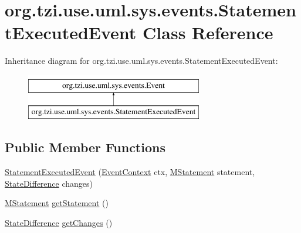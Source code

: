 \hypertarget{classorg_1_1tzi_1_1use_1_1uml_1_1sys_1_1events_1_1_statement_executed_event}{\section{org.\-tzi.\-use.\-uml.\-sys.\-events.\-Statement\-Executed\-Event Class Reference}
\label{classorg_1_1tzi_1_1use_1_1uml_1_1sys_1_1events_1_1_statement_executed_event}
}
Inheritance diagram for org.\-tzi.\-use.\-uml.\-sys.\-events.\-Statement\-Executed\-Event\-:\begin{figure}[H]
\begin{center}
\leavevmode
\includegraphics[height=2.000000cm]{classorg_1_1tzi_1_1use_1_1uml_1_1sys_1_1events_1_1_statement_executed_event}
\end{center}
\end{figure}
\subsection*{Public Member Functions}
\begin{DoxyCompactItemize}
\item 
\hyperlink{classorg_1_1tzi_1_1use_1_1uml_1_1sys_1_1events_1_1_statement_executed_event_a6d275841436f08306156d4e21918896f}{Statement\-Executed\-Event} (\hyperlink{enumorg_1_1tzi_1_1use_1_1uml_1_1sys_1_1events_1_1tags_1_1_event_context}{Event\-Context} ctx, \hyperlink{classorg_1_1tzi_1_1use_1_1uml_1_1sys_1_1soil_1_1_m_statement}{M\-Statement} statement, \hyperlink{classorg_1_1tzi_1_1use_1_1util_1_1soil_1_1_state_difference}{State\-Difference} changes)
\item 
\hyperlink{classorg_1_1tzi_1_1use_1_1uml_1_1sys_1_1soil_1_1_m_statement}{M\-Statement} \hyperlink{classorg_1_1tzi_1_1use_1_1uml_1_1sys_1_1events_1_1_statement_executed_event_ac902347048b650367e001f1fdfc534ae}{get\-Statement} ()
\item 
\hyperlink{classorg_1_1tzi_1_1use_1_1util_1_1soil_1_1_state_difference}{State\-Difference} \hyperlink{classorg_1_1tzi_1_1use_1_1uml_1_1sys_1_1events_1_1_statement_executed_event_a0517a6b8b91fc3a91007a95ac1b5f6d9}{get\-Changes} ()
\end{DoxyCompactItemize}


